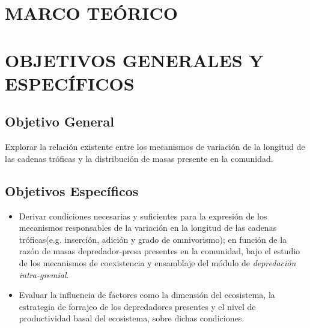 \documentclass [11pt,a4paper]{article}
\numberwithin{equation}{section}
\begin{document}
\tableofcontents
\listoffigures
\listoftables
\clearpage


\clearpage
{}


\section{MARCO TE\'ORICO}


\section{OBJETIVOS GENERALES Y ESPEC\'IFICOS}
\subsection{Objetivo General}
Explorar la relaci\'on existente entre los mecanismos de variaci\'on de la longitud de las cadenas tr\'oficas y la distribuci\'on de masas presente en la comunidad.
\subsection{Objetivos Espec\'ificos}
\begin{itemize}
\item Derivar condiciones necesarias y suficientes para la expresi\'on de los mecanismos responsables de la variaci\'on en la longitud de las cadenas tr\'oficas(e.g. inserci\'on, adici\'on y  grado de omnivorismo); en funci\'on de la raz\'on de masas depredador-presa presentes en la comunidad, bajo el estudio de los mecanismos de coexistencia y ensamblaje del m\'odulo de \emph{depredaci\'on intra-gremial}.
\item Evaluar la influencia de factores como la dimensi\'on del ecosistema, la estrategia de forrajeo de los depredadores presentes y el nivel de productividad basal del ecosistema, sobre dichas condiciones.
\end{itemize}
\end{document}

